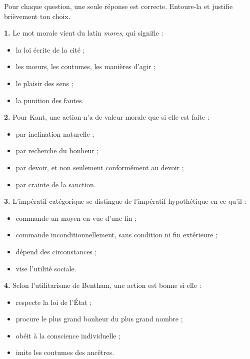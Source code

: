 \documentclass[11pt]{article}
\newcommand{\cle}[1]{{\popxbold\color{popdark}#1}}
\begin{document}
\begin{exercice}
Pour chaque question, une seule réponse est correcte. Entoure-la et justifie brièvement ton choix.

\textbf{1.} Le mot \cle{morale} vient du latin \emph{mores}, qui signifie :
\begin{itemize}
\item[a)] la loi écrite de la cité ;
\item[b)] les mœurs, les coutumes, les manières d'agir ;
\item[c)] le plaisir des sens ;
\item[d)] la punition des fautes.
\end{itemize}

\textbf{2.} Pour Kant, une action n'a de valeur morale que si elle est faite :
\begin{itemize}
\item[a)] par inclination naturelle ;
\item[b)] par recherche du bonheur ;
\item[c)] par devoir, et non seulement conformément au devoir ;
\item[d)] par crainte de la sanction.
\end{itemize}

\textbf{3.} L'\cle{impératif catégorique} se distingue de l'impératif hypothétique en ce qu'il :
\begin{itemize}
\item[a)] commande un moyen en vue d'une fin ;
\item[b)] commande inconditionnellement, sans condition ni fin extérieure ;
\item[c)] dépend des circonstances ;
\item[d)] vise l'utilité sociale.
\end{itemize}

\textbf{4.} Selon l'utilitarisme de Bentham, une action est bonne si elle :
\begin{itemize}
\item[a)] respecte la loi de l'État ;
\item[b)] procure le plus grand bonheur du plus grand nombre ;
\item[c)] obéit à la conscience individuelle ;
\item[d)] imite les coutumes des ancêtres.
\end{itemize}
\end{exercice}
\end{document}
